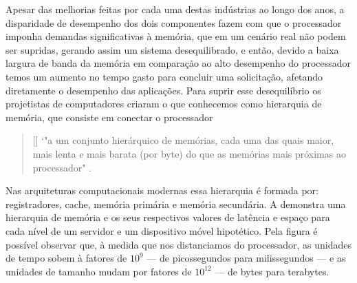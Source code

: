 Apesar das melhorias feitas por cada uma destas indústrias ao longo dos anos, a disparidade de desempenho dos dois componentes fazem com que o processador imponha demandas significativas à memória, que em um cenário real não podem ser supridas, gerando assim um sistema desequilibrado, e então, devido a baixa largura de banda da memória em comparação ao alto desempenho do processador temos um aumento no tempo gasto para concluir uma solicitação, afetando diretamente o desempenho das aplicações.
Para suprir esse desequilíbrio os projetistas de computadores criaram o que conhecemos como hierarquia de memória, que consiste em conectar o processador 
\begin{quotation}[]
`"a um conjunto hierárquico de memórias, cada uma das quais maior, mais lenta e mais barata (por byte) do que as memórias mais próximas ao processador" \cite[tradução nossa]{paper-gap-between-processor-memory}.
\end{quotation}

Nas arquiteturas computacionais modernas essa hierarquia é formada por: registradores, cache, memória primária e memória secundária. A  
demonstra uma hierarquia de memória e os seus respectivos valores de latência  e espaço para cada nível de um servidor e um dispositivo móvel hipotético. Pela figura é
possível observar que, à medida que nos distanciamos do processador, as unidades de tempo sobem à fatores de $10^9$ — de picossegundos para milissegundos — 
e as unidades de tamanho mudam por fatores de $10^{12}$ — de bytes para terabytes.

